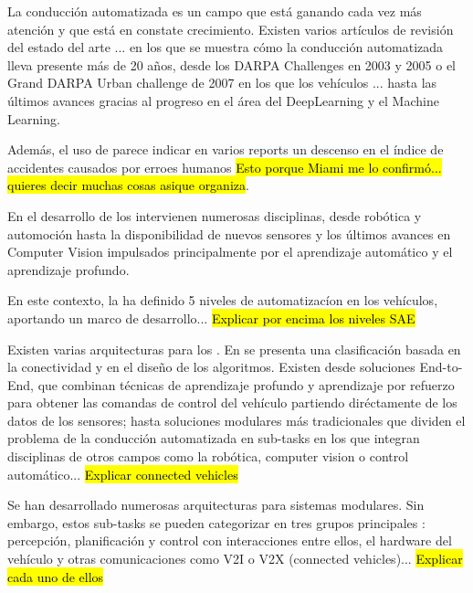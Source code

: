 
La conducción automatizada es un campo que está ganando cada vez más atención y que está en constate crecimiento. Existen varios artículos de revisión del estado del arte \cite{survey_AutomatedDriving1} \cite{survey_AutomatedDriving2}... en los que se muestra cómo la conducción automatizada lleva presente más de 20 años, desde los DARPA Challenges en 2003 y 2005 o el Grand DARPA Urban challenge de 2007 en los que los vehículos ... hasta las últimos avances gracias al progreso en el área del DeepLearning y el Machine Learning.

Además, el uso de  parece indicar en varios reports un descenso en el índice de accidentes causados por erroes humanos \hl{Esto porque Miami me lo confirmó... quieres decir muchas cosas asique organiza}.

En el desarrollo de los  intervienen numerosas disciplinas, desde robótica y automoción hasta la disponibilidad de nuevos sensores y los últimos avances en Computer Vision impulsados principalmente por el aprendizaje automático y el aprendizaje profundo.

En este contexto, la  ha definido 5 niveles de automatizacíon en los vehículos, aportando un marco de desarrollo... \hl{Explicar por encima los niveles SAE}

Existen varias arquitecturas para los . En \cite{survey_AutomatedDriving1} se presenta una clasificación basada en la conectividad y en el diseño de los algoritmos. Existen desde soluciones End-to-End, que combinan técnicas de aprendizaje profundo y aprendizaje por refuerzo para obtener las comandas de control del vehículo partiendo diréctamente de los datos de los sensores; hasta soluciones modulares más tradicionales que dividen el problema de la conducción automatizada en sub-tasks en los que integran disciplinas de otros campos como la robótica, computer vision o control automático...  \hl{Explicar connected vehicles}

Se han desarrollado numerosas arquitecturas para sistemas  modulares. Sin embargo, estos sub-tasks se pueden categorizar en tres grupos principales \cite{machines5010006}: percepción, planificación y control con interacciones entre ellos, el hardware del vehículo y otras comunicaciones como V2I o V2X (connected vehicles)... \hl{Explicar cada uno de ellos}



